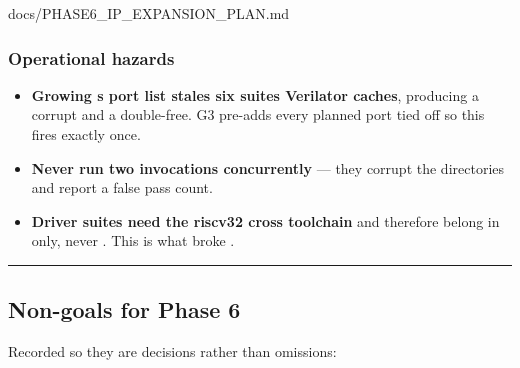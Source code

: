 \begin{relocated}{docs/PHASE6_IP_EXPANSION_PLAN.md}
\subsubsection{Operational hazards}\label{ds:ch:phase6-ip-expansion-plan:operational-hazards}

\begin{itemize}
\tightlist
\item
  \textbf{Growing \textquotesingle s port list
  stales six suites\textquotesingle{} Verilator caches}, producing a
  corrupt  and a double-free. G3 pre-adds every planned port
  tied off so this fires exactly once.
\item
  \textbf{Never run two  invocations concurrently} ---
  they corrupt the  directories and report a false
  pass count.
\item
  \textbf{Driver suites need the riscv32 cross toolchain} and therefore
  belong in  only, never . This is what
  broke .
\end{itemize}

\begin{center}\rule{0.5\linewidth}{0.5pt}\end{center}

\subsection{Non-goals for Phase 6}\label{ds:ch:phase6-ip-expansion-plan:11-non-goals-for-phase-6}

Recorded so they are decisions rather than omissions:

{\small\setlength{\tabcolsep}{4pt}

}
\end{relocated}
